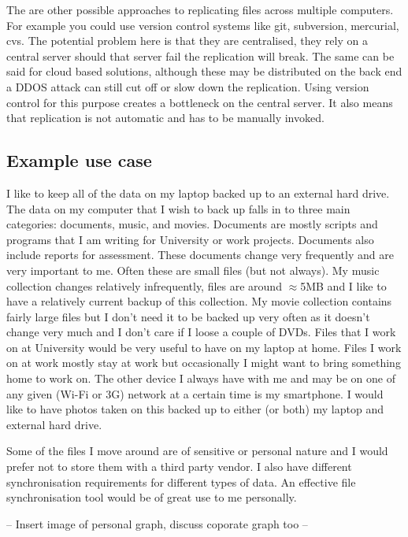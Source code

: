 \documentclass[12pt]{article}
\begin{document}
The are other possible approaches to replicating files
across multiple computers. For example you could use
version control systems like git, subversion, mercurial,
cvs. The potential problem here is that they are
centralised, they rely on a central server should that
server fail the replication will break. The same
can be said for cloud based solutions, although
these may be distributed on the back end a DDOS attack
can still cut off or slow down the replication.
Using version control for this purpose creates
a bottleneck on the central server. It also
means that replication is not automatic and has
to be manually invoked.


\subsection*{Example use case}

I like to keep all of the data on my laptop backed up to an
external hard drive. The data on my computer that I wish
to back up falls in to three main categories: documents, music, and movies.
Documents are mostly scripts and programs that I am writing for
University or work projects. Documents also include reports for
assessment. These documents change very frequently and are very important
to me. Often these are small files (but not always). My music collection
changes relatively infrequently, files are around $\approx$5MB and I like to
have a relatively current backup of this collection. My movie collection
contains fairly large files but I don't need it to be backed up very often
as it doesn't change very much and I don't care if I loose a couple of
DVDs. Files that I work on at University would be very useful to have
on my laptop at home. Files I work on at work mostly stay at work
but occasionally I might want to bring something home to work on.
The other device I always have with me and may be on one of any given
(Wi-Fi or 3G) network at a certain time is my smartphone. I would like
to have photos taken on this backed up to either (or both) my laptop and
external hard drive. 

Some of the files I move around are of sensitive or personal nature
and I would prefer not to store them with a third party vendor.
I also have different synchronisation requirements for different
types of data. An effective file synchronisation tool would be of
great use to me personally.

-- Insert image of personal graph, discuss coporate graph too --
\end{document}
